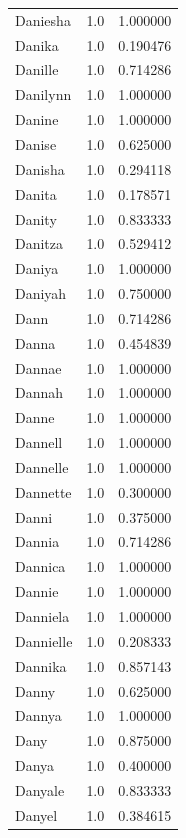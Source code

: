 \documentclass[
  letterpaper,
  DIV=11,
  numbers=noendperiod]{scrreprt}
\begin{document}
\begin{tabular}{lrr}
Daniesha        &   1.0 &   1.000000 \\
Danika          &   1.0 &   0.190476 \\
Danille         &   1.0 &   0.714286 \\
Danilynn        &   1.0 &   1.000000 \\
Danine          &   1.0 &   1.000000 \\
Danise          &   1.0 &   0.625000 \\
Danisha         &   1.0 &   0.294118 \\
Danita          &   1.0 &   0.178571 \\
Danity          &   1.0 &   0.833333 \\
Danitza         &   1.0 &   0.529412 \\
Daniya          &   1.0 &   1.000000 \\
Daniyah         &   1.0 &   0.750000 \\
Dann            &   1.0 &   0.714286 \\
Danna           &   1.0 &   0.454839 \\
Dannae          &   1.0 &   1.000000 \\
Dannah          &   1.0 &   1.000000 \\
Danne           &   1.0 &   1.000000 \\
Dannell         &   1.0 &   1.000000 \\
Dannelle        &   1.0 &   1.000000 \\
Dannette        &   1.0 &   0.300000 \\
Danni           &   1.0 &   0.375000 \\
Dannia          &   1.0 &   0.714286 \\
Dannica         &   1.0 &   1.000000 \\
Dannie          &   1.0 &   1.000000 \\
Danniela        &   1.0 &   1.000000 \\
Dannielle       &   1.0 &   0.208333 \\
Dannika         &   1.0 &   0.857143 \\
Danny           &   1.0 &   0.625000 \\
Dannya          &   1.0 &   1.000000 \\
Dany            &   1.0 &   0.875000 \\
Danya           &   1.0 &   0.400000 \\
Danyale         &   1.0 &   0.833333 \\
Danyel          &   1.0 &   0.384615 \\

\end{tabular}
\end{document}
